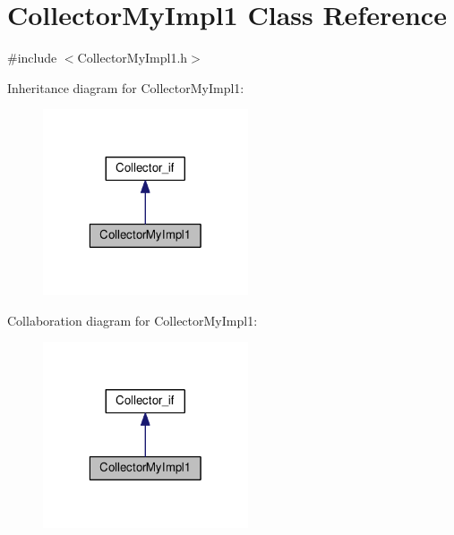 \hypertarget{class_collector_my_impl1}{\section{Collector\-My\-Impl1 Class Reference}
\label{class_collector_my_impl1}
}


{\ttfamily \#include $<$Collector\-My\-Impl1.\-h$>$}



Inheritance diagram for Collector\-My\-Impl1\-:\nopagebreak
\begin{figure}[H]
\begin{center}
\leavevmode
\includegraphics[width=172pt]{class_collector_my_impl1__inherit__graph}
\end{center}
\end{figure}


Collaboration diagram for Collector\-My\-Impl1\-:\nopagebreak
\begin{figure}[H]
\begin{center}
\leavevmode
\includegraphics[width=172pt]{class_collector_my_impl1__coll__graph}
\end{center}
\end{figure}

